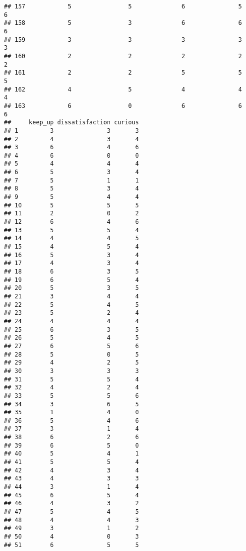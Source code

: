 \documentclass[
]{article}
\begin{document}
\begin{verbatim}
## 157            5                5              6               5              6
## 158            5                3              6               6              6
## 159            3                3              3               3              3
## 160            2                2              2               2              2
## 161            2                2              5               5              5
## 162            4                5              4               4              4
## 163            6                0              6               6              6
##     keep_up dissatisfaction curious
## 1         3               3       3
## 2         4               3       4
## 3         6               4       6
## 4         6               0       0
## 5         4               4       4
## 6         5               3       4
## 7         5               1       1
## 8         5               3       4
## 9         5               4       4
## 10        5               5       5
## 11        2               0       2
## 12        6               4       6
## 13        5               5       4
## 14        4               4       5
## 15        4               5       4
## 16        5               3       4
## 17        4               3       4
## 18        6               3       5
## 19        6               5       4
## 20        5               3       5
## 21        3               4       4
## 22        5               4       5
## 23        5               2       4
## 24        4               4       4
## 25        6               3       5
## 26        5               4       5
## 27        6               5       6
## 28        5               0       5
## 29        4               2       5
## 30        3               3       3
## 31        5               5       4
## 32        4               2       4
## 33        5               5       6
## 34        3               6       5
## 35        1               4       0
## 36        5               4       6
## 37        3               1       4
## 38        6               2       6
## 39        6               5       0
## 40        5               4       1
## 41        5               5       4
## 42        4               3       4
## 43        4               3       3
## 44        3               1       4
## 45        6               5       4
## 46        4               3       2
## 47        5               4       5
## 48        4               4       3
## 49        3               1       2
## 50        4               0       3
## 51        6               5       5

\end{verbatim}
\end{document}
